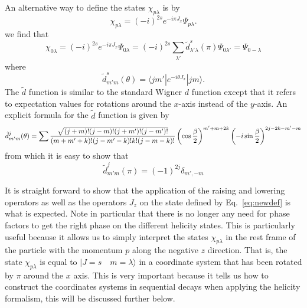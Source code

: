 An alternative way to define the states $\chi_{p\lambda}$ is by
\begin{equation}
\chi_{p\lambda}=(-i)^{2s}e^{-i\pi J_x}\Psi_{p\lambda}.
\label{eq:newdef}
\end{equation}
we find that
\begin{equation}
\chi_{0\lambda}=(-i)^{2s}e^{-i\pi J_x}\Psi_{0\lambda}=
(-i)^{2s}\sum_{\lambda'}\tilde d^s_{\lambda'\lambda}(\pi)\Psi_{0\lambda'}=\Psi_{0-\lambda}
\end{equation}
where
\begin{equation}
\tilde d^s_{m'm}(\theta)=\langle j m'|e^{-i\theta J_x}|j m\rangle.
\end{equation}
The $\tilde d$ function is similar to the standard Wigner $d$ function 
except that it refers to expectation values for rotations around the 
$x$-axis instead of the $y$-axis. An explicit formula for the 
$\tilde d$ function is given by
\begin{equation}
\tilde d^j_{m'm}(\theta)=
\sum {\sqrt{(j+m)!(j-m)!(j+m')!(j-m')!}\over (m+m'+k)!(j-m'-k)!k!(j-m-k)!}
\left(\cos{\beta\over 2}\right)^{m'+m+2k}
\left(-i\sin{\beta\over 2}\right)^{2j-2k-m'-m}
\end{equation}
from which it is easy to show that
\begin{equation}
\tilde d^j_{m'm}(\pi)=(-1)^{2j}\delta_{m',-m}
\end{equation}

It is straight forward to show that the application of the raising and
lowering operators as well as the operators $J_z$ on the state defined
by Eq.~\ref{eq:newdef} is what is expected.
Note in particular that there is no longer any need for phase factors
to get the right phase on the different helicity states. This is
particularly useful because it allows us to simply interpret
the states $\chi_{p\lambda}$ in the rest frame of the particle with the
momentum $p$ along the negative $z$ direction. That is, the state
$\chi_{p\lambda}$ is equal to $|J=s\quad m=\lambda\rangle$ 
in a coordinate system that 
has been rotated by $\pi$ around the $x$ axis. This is very important
because it tells us how to construct the coordinates systems in
sequential decays when applying the helicity formalism, this will
be discussed further below.

